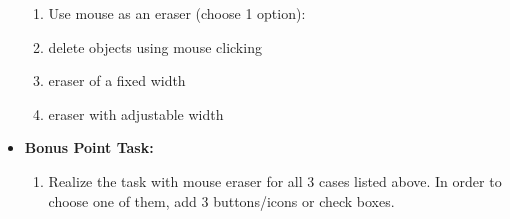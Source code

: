 \begin{itemize}
\begin{enumerate}
     \item Use mouse as an eraser (choose 1 option):
    \item  delete objects using mouse clicking
    \item  eraser of a fixed width
   \item   eraser with adjustable width
    \end{enumerate}
\item \textbf{Bonus Point Task:} 
    \begin{enumerate}
    \item Realize the task with mouse eraser for all 3 cases listed above. In order to choose one of them, add 3 buttons/icons or check boxes.
    \end{enumerate}
  \end{itemize}  

\clearpage